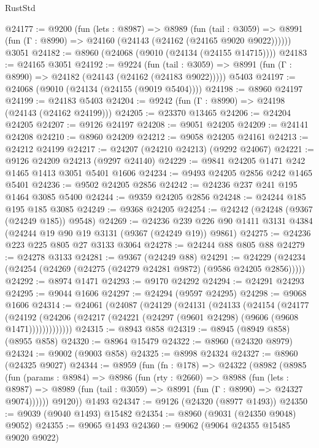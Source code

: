 \begin{lexlean}{RustStd}
\begin{coremodule}
@24177 := @9200
    (fun (lets : @8987) =>
    @8989
      (fun (tail : @3059) =>
      @8991 (fun (Γ : @8990) => @24160 (@24143 (@24162 (@24165 @9020 @9022))))))
    @3051
@24182 := @8960 (@24068 (@9010 (@24134 (@24155 @14715))))
@24183 := @24165 @3051
@24192 := @9224
    (fun (tail : @3059) => @8991 (fun (Γ : @8990) => @24182 (@24143 (@24162 (@24183 @9022)))))
    @5403
@24197 := @24068 (@9010 (@24134 (@24155 (@9019 @5404))))
@24198 := @8960 @24197
@24199 := @24183 @5403
@24204 := @9242 (fun (Γ : @8990) => @24198 (@24143 (@24162 @24199)))
@24205 := @23370 @13465
@24206 := @24204 @24205
@24207 := @9126 @24197
@24208 := @9051 @24205
@24209 := @24141 @24208
@24210 := @8960 @24209
@24212 := @9058 @24205 @24161
@24213 := @24212 @24199
@24217 := @24207 (@24210 @24213) (@9292 @24067)
@24221 := @9126 @24209 @24213 (@9297 @24140)
@24229 := @9841 @24205 @1471 @242 @1465 @1413 @3051 @5401 @1606
@24234 := @9493 @24205 @2856 @242 @1465 @5401
@24236 := @9502 @24205 @2856
@24242 := @24236 @237 @241 @195 @1464 @3085 @5400
@24244 := @9359 @24205 @2856
@24248 := @24244 @185 @195 @185 @3085
@24249 := @9368 @24205
@24254 := @24242 (@24248 (@9367 (@24249 @185)) @9548)
@24269 := @24236
    @239
    @226
    @90
    @1411
    @3131
    @4384
    (@24244 @19 @90 @19 @3131 (@9367 (@24249 @19)) @9861)
@24275 := @24236 @223 @225 @805 @27 @3133 @3064
@24278 := @24244 @88 @805 @88
@24279 := @24278 @3133
@24281 := @9367 (@24249 @88)
@24291 := @24229 (@24234 (@24254 (@24269 (@24275 (@24279 @24281 @9872) (@9586 @24205 @2856)))))
@24292 := @8974 @1471
@24293 := @9170 @24292
@24294 := @24291 @24293
@24295 := @9044 @1606
@24297 := @24294 (@9597 @24295)
@24298 := @9068 @1606
@24314 := @24061
    (@24087
      (@24129
        (@24131
          (@24133
            (@24154
              (@24177
                (@24192
                  (@24206 (@24217 (@24221 (@24297 (@9601 @24298) (@9606 (@9608 @1471)))))))))))))
@24315 := @8943 @858
@24319 := @8945 (@8949 @858) (@8955 @858)
@24320 := @8964 @15479
@24322 := @8960 (@24320 @8979)
@24324 := @9002 (@9003 @858)
@24325 := @8998 @24324
@24327 := @8960 (@24325 @9027)
@24344 := @8959
    (fun (fn : @178) =>
    @24322
      (@8982
        (@8985
          (fun (params : @8984) =>
          @8986
            (fun (rty : @2660) =>
            @8988
              (fun (lets : @8987) =>
              @8989 (fun (tail : @3059) => @8991 (fun (Γ : @8990) => @24327 @9074))))))
        @9120))
    @1493
@24347 := @9126 (@24320 (@8977 @1493))
@24350 := @9039 (@9040 @1493) @15482
@24354 := @8960 (@9031 (@24350 @9048) @9052)
@24355 := @9065 @1493
@24360 := @9062 (@9064 @24355 @15485 @9020 @9022)

\end{coremodule}
\end{lexlean}
